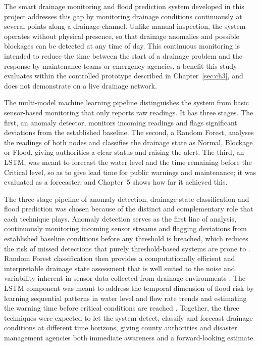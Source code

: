 \documentclass[12pt, a4paper]{article}
\begin{document}
The smart drainage monitoring and flood prediction system developed in this project addresses this gap by monitoring drainage conditions continuously at several points along a drainage channel. Unlike manual inspection, the system operates without physical presence, so that drainage anomalies and possible blockages can be detected at any time of day. This continuous monitoring is intended to reduce the time between the start of a drainage problem and the response by maintenance teams or emergency agencies, a benefit this study evaluates within the controlled prototype described in Chapter~\ref{sec:ch3}, and does not demonstrate on a live drainage network.

The multi-model machine learning pipeline distinguishes the system from basic sensor-based monitoring that only reports raw readings. It has three stages. The first, an anomaly detector, monitors incoming readings and flags significant deviations from the established baseline. The second, a Random Forest, analyses the readings of both nodes and classifies the drainage state as Normal, Blockage or Flood, giving authorities a clear status and raising the alert. The third, an LSTM, was meant to forecast the water level and the time remaining before the Critical level, so as to give lead time for public warnings and maintenance; it was evaluated as a forecaster, and Chapter~5 shows how far it achieved this.

The three-stage pipeline of anomaly detection, drainage state classification and flood prediction was chosen because of the distinct and complementary role that each technique plays. Anomaly detection serves as the first line of analysis, continuously monitoring incoming sensor streams and flagging deviations from established baseline conditions before any threshold is breached, which reduces the risk of missed detections that purely threshold-based systems are prone to \citep{salim2024}. Random Forest classification then provides a computationally efficient and interpretable drainage state assessment that is well suited to the noise and variability inherent in sensor data collected from drainage environments \citep{sathiyamoorthy2025}. The LSTM component was meant to address the temporal dimension of flood risk by learning sequential patterns in water level and flow rate trends and estimating the warning time before critical conditions are reached \citep{bao2025}. Together, the three techniques were expected to let the system detect, classify and forecast drainage conditions at different time horizons, giving county authorities and disaster management agencies both immediate awareness and a forward-looking estimate.
\end{document}
